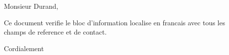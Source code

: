 \documentclass[basic, infoblock, lang=french]{../../onlinebrief24}
\begin{document}
\begin{letter}{}
\opening{Monsieur Durand,}

Ce document verifie le bloc d'information localise en francais avec
tous les champs de reference et de contact.

\closing{Cordialement}
\end{letter}
\end{document}
